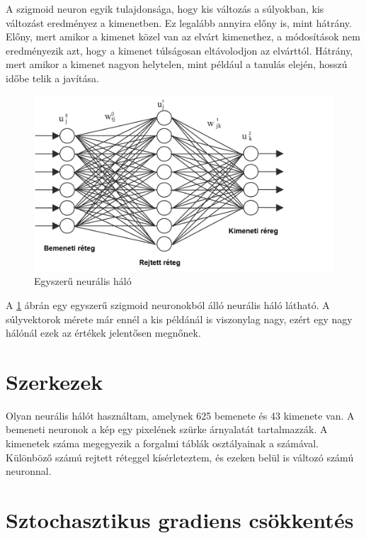 A szigmoid neuron egyik tulajdonsága, hogy kis változás a súlyokban, kis változást eredményez a kimenetben. Ez legalább annyira előny is, mint hátrány. Előny, mert amikor a kimenet közel van az elvárt kimenethez, a módosítások nem eredményezik azt, hogy a kimenet túlságosan eltávolodjon az elvárttól. Hátrány, mert amikor a kimenet nagyon helytelen, mint például a tanulás elején, hosszú időbe telik a javítása.

\begin{figure}[h]
\centering

\includegraphics[scale=0.5]{images/net}
\caption{Egyszerű neurális háló}

\label{fig:net}
\end{figure}

A \ref{fig:net} ábrán egy egyszerű szigmoid neuronokból álló neurális háló látható. A súlyvektorok mérete már ennél a kis példánál is viszonylag nagy, ezért egy nagy hálónál ezek az értékek jelentősen megnőnek.


\section{Szerkezek}\label{sec:INTRO:architecture}

Olyan neurális hálót használtam, amelynek 625 bemenete és 43 kimenete van. A bemeneti neuronok a kép egy pixelének szürke árnyalatát tartalmazzák. A kimenetek száma megegyezik a forgalmi táblák osztályainak a számával. Különböző számú rejtett réteggel kísérleteztem, és ezeken belül is változó számú neuronnal.

\section{Sztochasztikus gradiens csökkentés}\label{sec:INTRO:graddesc}

